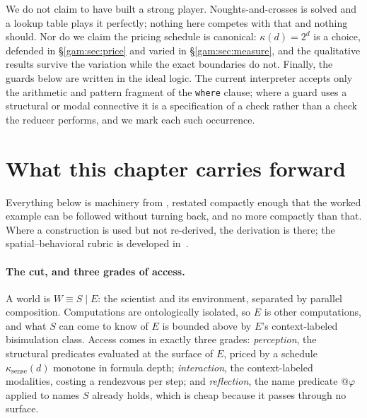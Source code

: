 We do not claim to have built a strong player. Noughts-and-crosses is solved and
a lookup table plays it perfectly; nothing here competes with that and nothing
should. Nor do we claim the pricing schedule is canonical: $\kappa(d)=2^{d}$ is
a choice, defended in \S\ref{gam:sec:price} and varied in \S\ref{gam:sec:measure}, and
the qualitative results survive the variation while the exact boundaries do not.
Finally, the guards below are written in the ideal logic. The current
interpreter accepts only the arithmetic and pattern fragment of the
\texttt{where} clause; where a guard uses a structural or modal connective it is
a specification of a check rather than a check the reducer performs, and we mark
each such occurrence.

\section{What this chapter carries forward}\label{gam:sec:import}\label{gam:S2}

Everything below is machinery from \chSci, restated compactly enough that the
worked example can be followed without turning back, and no more compactly than
that. Where a construction is used but not re-derived, the derivation is there;
the spatial--behavioral rubric is developed in~\cite{ClassifierNote}.

\paragraph{The cut, and three grades of access.} A world is $W \equiv S \mid E$:
the scientist and its environment, separated by parallel composition.
Computations are ontologically isolated, so $E$ is other computations, and what
$S$ can come to know of $E$ is bounded above by $E$'s context-labeled
bisimulation class. Access comes in exactly three grades: \emph{perception},
the structural predicates evaluated at the surface of $E$, priced by a schedule
$\kappa_{\mathrm{sense}}(d)$ monotone in formula depth; \emph{interaction}, the
context-labeled modalities, costing a rendezvous per step; and
\emph{reflection}, the name predicate $@\varphi$ applied to names $S$ already
holds, which is cheap because it passes through no surface.

